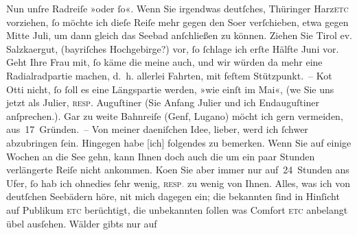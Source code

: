 \pstart
           Nun unſre Radreiſe »oder{ }ſo«. Wenn Sie irgendwas deutſches, Thüringer Harz\textsc{etc} vorziehen,{ }ſo möchte ich dieſe Reiſe mehr gegen den
                  So{\geminationm}er verſchieben, etwa gegen Mitte Juli, um dann gleich das Seebad an{\pb}ſchließen zu
               können. Ziehen Sie Tirol ev. Salzka{\geminationm}ergut, (bayriſches Hochgebirge?) vor,{ }ſo{ }ſchlage ich erſte
               Hälfte Juni vor. Geht Ihre Frau mit,{ }ſo käme die meine auch, und wir würden da{\geminationn} mehr eine Radialradpartie machen, d. h. allerlei
               Fahrten, mit feſtem Stützpunkt. – Ko{\geminationm}t Otti nicht,{ }ſo{ }ſoll es eine Längspartie werden, »wie einſt im
               Mai«, (we{\geminationn} Sie uns jetzt als Julier, \textsc{resp.} Auguſtiner (Sie \introOben{}Anfang\introOben{} Julier
               und ich Endauguſtiner anſprechen.). Gar zu weite Bahnreiſe (Genf, Lugano) möcht ich
               gern vermeiden, {\pb}aus 17 Gründen. – Von meiner
                  daeniſchen Idee, lieber,
               werd ich{ }ſchwer abzubringen{ }ſein. Hingegen habe {[}ich{]} folgendes zu
               bemerken. Wenn Sie auf einige Wochen an die See gehn, kann Ihnen doch auch die um ein paar Stunden
               verlängerte Reiſe nicht ankommen. Ko{\geminationm}en Sie aber immer
               nur auf 24 Stunden ans Ufer,{ }ſo hab ich ohnedies{ }ſehr wenig, \textsc{resp\textcolor{gray}{.}} zu wenig von Ihnen. Alles, was ich von deutſchen Seebädern höre, ni{\geminationm}t
               mich dagegen ein; die bekannten {\pb}ſind in
               Hinſicht auf Publikum \textsc{etc} berüchtigt, die unbekannten{ }ſollen was Comfor\strikeout{\textcolor{gray}{×}}t \textsc{etc} anbelangt übel ausſehen. Wälder gibts nur auf
